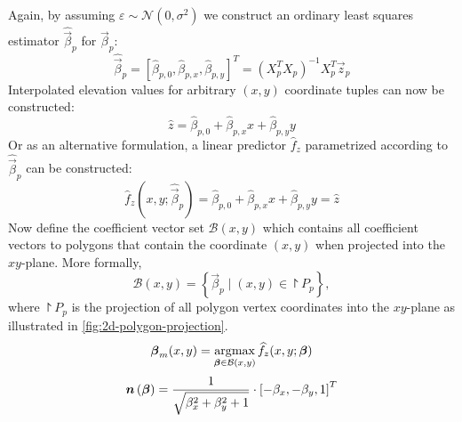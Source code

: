 %
Again, by assuming $\varepsilon \sim \mathcal{N}(0, \sigma^2)$ we construct an ordinary least squares estimator $\widehat{\vec{\beta}}_p $ for $\vec{\beta}_p$:
%
\begin{equation*}
  \widehat{\vec{\beta}}_p
  =
  {\left[
    \widehat{\beta}_{p,0},
    \widehat{\beta}_{p,x},
    \widehat{\beta}_{p,y}
  \right]}^T
  =
  \left( X_p^T X_p \right)^{-1} X_p^T \vec{z}_p
\end{equation*}
%
Interpolated elevation values for arbitrary $(x, y)$ coordinate tuples can now be constructed:
%
\begin{equation*}
  \widehat{z} = \widehat{\beta}_{p,0} + \widehat{\beta}_{p,x} x + \widehat{\beta}_{p,y} y
\end{equation*}
%
Or as an alternative formulation, a linear predictor $\widehat{f}_z$ parametrized according to $\widehat{\vec{\beta}}_p$ can be constructed:
%
\begin{equation*}
  \widehat{f}_z\left(x, y; \widehat{\vec{\beta}}_p\right)
  =
    \widehat{\beta}_{p,0}
    + \widehat{\beta}_{p,x} x
    + \widehat{\beta}_{p,y} y
  =
  \widehat{z}
\end{equation*}
%
Now define the coefficient vector set $\mathcal{B}(x, y)$ which contains all coefficient vectors to polygons that contain the coordinate $(x, y)$ when projected into the $xy$-plane.
More formally,
%
\begin{equation*}
  \mathcal{B}(x, y) = \left\{
    \vec{\beta}_p
    \mid
    (x, y) \in \project{P_p}
  \right\},
\end{equation*}
%
where $\project{P_p}$ is the projection of all polygon vertex coordinates into the $xy$-plane as illustrated in \cref{fig:2d-polygon-projection}.
%
\begin{equation*}
  \boldsymbol{\beta}_m(x, y)
  =
  \operatorname*{\arg\!\max}_{\boldsymbol{\beta} \in \mathcal{B}(x, y)}
    \widehat{f}_z(x, y; \boldsymbol{\beta})
\end{equation*}
%
\begin{equation*}
  \vec{n}\left(\vec{\beta}\right)
  =
  \frac{%
    1
  }{%
    \sqrt{\beta_x^2 + \beta_y^2 + 1}
  }
  \cdot
  {\left[
    -\beta_{x}, -\beta_{y}, 1
  \right]}^T
\end{equation*}



